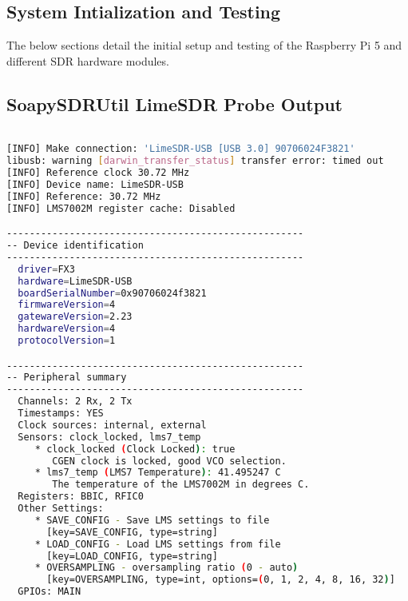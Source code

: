\begin{appendices}
\cleardoublepage

\chapter{System Intialization and Testing}

The below sections detail the initial setup and testing of the Raspberry Pi 5 and different SDR hardware modules.

\section{SoapySDRUtil LimeSDR Probe Output}
\begin{lstlisting}[language=bash, caption={SoapySDRUtil Probe Output for LimeSDR}, label={lst: soapyProbe}]

[INFO] Make connection: 'LimeSDR-USB [USB 3.0] 90706024F3821'
libusb: warning [darwin_transfer_status] transfer error: timed out
[INFO] Reference clock 30.72 MHz
[INFO] Device name: LimeSDR-USB
[INFO] Reference: 30.72 MHz
[INFO] LMS7002M register cache: Disabled

----------------------------------------------------
-- Device identification
----------------------------------------------------
  driver=FX3
  hardware=LimeSDR-USB
  boardSerialNumber=0x90706024f3821
  firmwareVersion=4
  gatewareVersion=2.23
  hardwareVersion=4
  protocolVersion=1

----------------------------------------------------
-- Peripheral summary
----------------------------------------------------
  Channels: 2 Rx, 2 Tx
  Timestamps: YES
  Clock sources: internal, external
  Sensors: clock_locked, lms7_temp
     * clock_locked (Clock Locked): true
        CGEN clock is locked, good VCO selection.
     * lms7_temp (LMS7 Temperature): 41.495247 C
        The temperature of the LMS7002M in degrees C.
  Registers: BBIC, RFIC0
  Other Settings:
     * SAVE_CONFIG - Save LMS settings to file
       [key=SAVE_CONFIG, type=string]
     * LOAD_CONFIG - Load LMS settings from file
       [key=LOAD_CONFIG, type=string]
     * OVERSAMPLING - oversampling ratio (0 - auto)
       [key=OVERSAMPLING, type=int, options=(0, 1, 2, 4, 8, 16, 32)]
  GPIOs: MAIN


\end{lstlisting}
\end{appendices}
